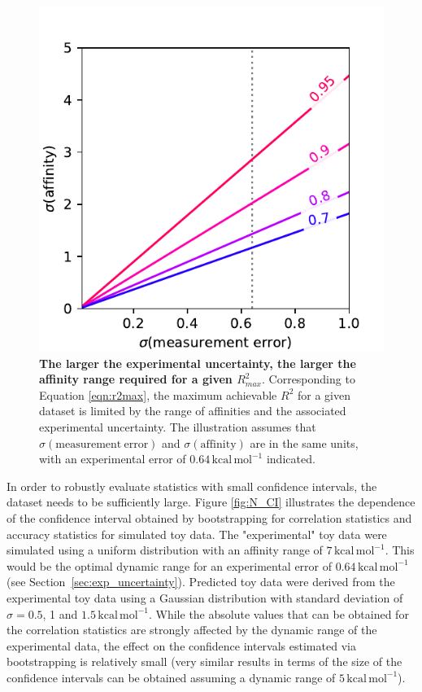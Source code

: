 \documentclass[9pt,bestpractices]{livecoms}
\begin{document}
\begin{figure}[!ht]
    \includegraphics[width=0.95\linewidth]{figures/R2max.pdf}
    \caption{\textbf{The larger the experimental uncertainty, the larger the affinity range required for a given $R^2_{max}$}. Corresponding to Equation \ref{eqn:r2max}, the maximum achievable $R^2$ for a given dataset is limited by the range of affinities and the associated experimental uncertainty. The illustration assumes that $\sigma(\mathrm{measurement\ error})$ and $\sigma(\mathrm{affinity})$ are in the same units, with an experimental error of $0.64\,\mathrm{kcal\,mol^{-1}}$ indicated.}
    \label{fig:r2max}
\end{figure}

In order to robustly evaluate statistics with small confidence intervals, the dataset needs to be sufficiently large. 
Figure \ref{fig:N_CI} illustrates the dependence of the confidence interval obtained by bootstrapping for correlation statistics and accuracy statistics for simulated toy data. 
The "experimental" toy data were simulated using a uniform distribution with an affinity range of $7\,\mathrm{kcal\,mol^{-1}}$. 
This would be the optimal dynamic range for an experimental error of $0.64\,\mathrm{kcal\,mol^{-1}}$ (see Section~\ref{sec:exp_uncertainty}). 
Predicted toy data were derived from the experimental toy data using a Gaussian distribution with standard deviation of $\sigma = 0.5$, 1 and $1.5\,\mathrm{kcal\,mol^{-1}}$. 
While the absolute values that can be obtained for the correlation statistics are strongly affected by the dynamic range of the experimental data, the effect on the confidence intervals estimated via bootstrapping is relatively small (very similar results in terms of the size of the confidence intervals can be obtained assuming a dynamic range of $5\,\mathrm{kcal\,mol^{-1}}$).
\end{document}
